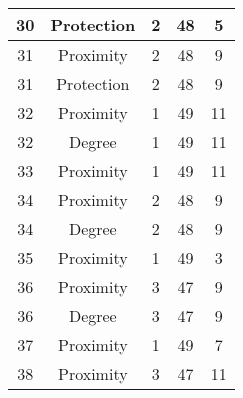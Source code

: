 \documentclass[results.tex]{subfiles}
\begin{document}
\begin{center}
\begin{tabular}{| c || c | c | c | c |}
            \hline
            30                      & Protection                   & 2                      & 48                      & 5                    \\
            \hline
            31                      & Proximity                    & 2                      & 48                      & 9                    \\
            \hline
            31                      & Protection                   & 2                      & 48                      & 9                    \\
            \hline
            32                      & Proximity                    & 1                      & 49                      & 11                   \\
            \hline
            32                      & Degree                       & 1                      & 49                      & 11                   \\
            \hline
            33                      & Proximity                    & 1                      & 49                      & 11                   \\
            \hline
            34                      & Proximity                    & 2                      & 48                      & 9                    \\
            \hline
            34                      & Degree                       & 2                      & 48                      & 9                    \\
            \hline
            35                      & Proximity                    & 1                      & 49                      & 3                    \\
            \hline
            36                      & Proximity                    & 3                      & 47                      & 9                    \\
            \hline
            36                      & Degree                       & 3                      & 47                      & 9                    \\
            \hline
            37                      & Proximity                    & 1                      & 49                      & 7                    \\
            \hline
            38                      & Proximity                    & 3                      & 47                      & 11                   \\

\end{tabular}
\end{center}
\end{document}
